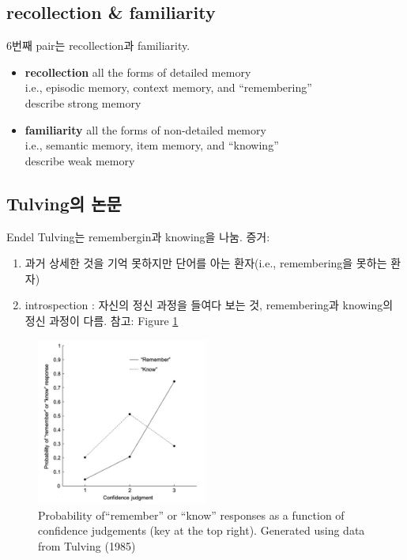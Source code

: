 \documentclass[../note.tex]{subfiles}
\begin{document}
\subsection{recollection \& familiarity}
6번째 pair는 recollection과 familiarity.

\begin{itemize}
  \item{\textbf{recollection}}
    all the forms of detailed memory\\
    i.e., episodic memory, context memory, and ``remembering''\\
    describe strong memory
  \item{\textbf{familiarity}}
    all the forms of non-detailed memory\\
    i.e., semantic memory, item memory, and ``knowing''\\
    describe weak memory
\end{itemize}

\subsection{Tulving의 논문}
Endel Tulving는 remembergin과 knowing을 나눔. 증거:
\begin{enumerate}
  \item 과거 상세한 것을 기억 못하지만 단어를 아는 환자(i.e., remembering을 못하는 환자)
  \item introspection : 자신의 정신 과정을 들여다 보는 것, remembering과 knowing의 정신 과정이 다름.
    참고: Figure \ref{fig:tulving_experiment}
\end{enumerate}

\begin{figure}[h]
  \centering
  \includegraphics[width=0.5\textwidth]{image/tulving_experiment}
  \caption{Probability of“remember” or
“know” responses as a function of confidence
judgements (key at the top right). Generated using data from Tulving (1985)}
  \label{fig:tulving_experiment}
\end{figure}
\end{document}
